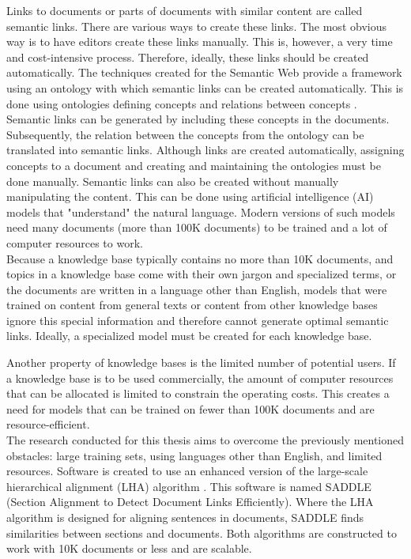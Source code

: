 Links to documents or parts of documents with similar content are called semantic links. There are various ways to create these links. The most obvious way is to have editors create these links manually. This is, however, a very time and cost-intensive process. Therefore, ideally, these links should be created automatically. The techniques created for the Semantic Web \citep{berners2001semantic} provide a framework using an ontology with which semantic links can be created automatically. This is done using ontologies defining concepts and relations between concepts \citep{Erdmann:2000vn}. Semantic links can be generated by including these concepts in the documents. Subsequently, the relation between the concepts from the ontology can be translated into semantic links. Although links are created automatically, assigning concepts to a document and creating and maintaining the ontologies must be done manually. Semantic links can also be created without manually manipulating the content. This can be done using artificial intelligence (AI) models that "understand" the natural language. Modern versions of such models need many documents (more than 100K documents) to be trained and a lot of computer resources to work.\\

Because a knowledge base typically contains no more than 10K documents, and topics in a knowledge base come with their own jargon and specialized terms, or the documents are written in a language other than English, models that were trained on content from general texts or content from other knowledge bases ignore this special information and therefore cannot generate optimal semantic links. Ideally, a specialized model must be created for each knowledge base.

Another property of knowledge bases is the limited number of potential users. If a knowledge base is to be used commercially, the amount of computer resources that can be allocated is limited to constrain the operating costs. This creates a need for models that can be trained on fewer than 100K documents and are resource-efficient.\\

The research conducted for this thesis aims to overcome the previously mentioned obstacles: large training sets, using languages other than English, and limited resources. Software is created to use an enhanced version of the large-scale hierarchical alignment (LHA) algorithm \citep{nikolov2018large}. This software is named SADDLE (Section Alignment to Detect Document Links Efficiently). Where the LHA algorithm is designed for aligning sentences in documents, SADDLE finds similarities between sections and documents. Both algorithms are constructed to work with 10K documents or less and are scalable.\\

